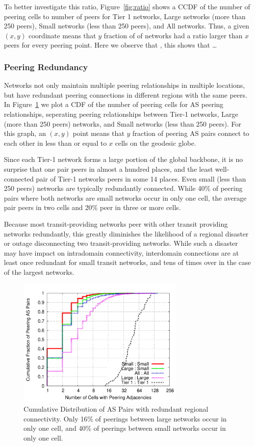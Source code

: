     To better investigate this ratio, Figure~\ref{fig:ratio} shows a CCDF of the number of peering cells to number of peers for Tier 1 networks, Large networks (more than 250 peers), Small networks (less than 250 peers), and All networks. 
    Thus, a given $(x,y)$ coordinate means that $y$ fraction of of networks had a ratio larger than $x$ peers for every peering point.
    Here we observe that \justine{\ldots}, this shows that \ldots

\subsubsection*{Peering Redundancy}
    Networks not only maintain multiple peering relationships in multiple locations, but have redundant peering connections in different regions with the same peers.
    In Figure~\ref{fig:peering_redundancy} we plot a CDF of the number of peering cells for AS peering relationships, seperating peering relationships between Tier-1 networks, Large (more than 250 peers) networks, and Small networks (less than 250 peers).
    For this graph, an $(x,y)$ point means that $y$ fraction of peering AS pairs connect to each other in less than or equal to $x$ cells on the geodesic globe.

    Since each Tier-1 network forms a large portion of the global backbone, it is no surprise that one pair peers in almost a hundred places, and the least well-connected pair of Tier-1 networks peers in some 14 places.
    Even small (less than 250 peers) networks are typically redundantly connected. 
    While 40\% of peering pairs where both networks are small networks occur in only one cell, the average pair peers in two cells and 20\% peer in three or more cells. 

    Because most transit-providing networks peer with other transit providing networks redundantly, this greatly diminishes the likelihood of a regional disaster or outage disconnecting two transit-providing networks.
    While such a disaster may have impact on intradomain connectivity, interdomain connections are at least once redundant for small transit networks, and tens of times over in the case of the largest networks.

\begin{figure}[tb]
\centering
\includegraphics[width=3.25in]{peering}
\caption[]{\label{fig:peering_redundancy} Cumulative Distribution of AS Pairs with redundant regional connectivity. Only 16\% of peerings between large networks occur in only one cell, and 40\% of peerings between small networks occur in only one cell.} 
\end{figure}

